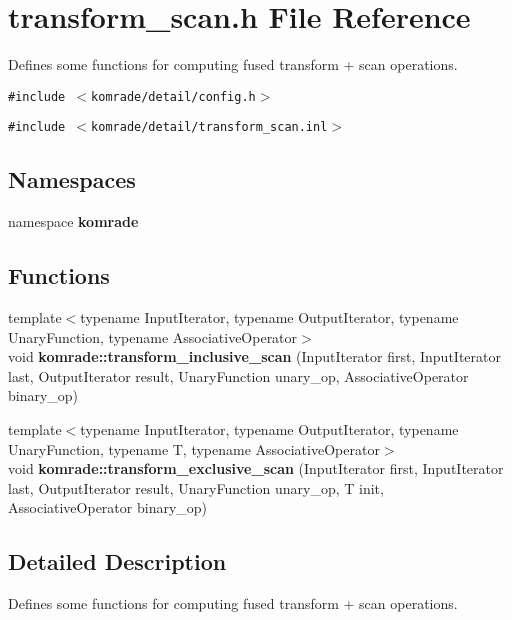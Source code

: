 \section{transform\_\-scan.h File Reference}
\label{transform__scan_8h}
Defines some functions for computing fused transform + scan operations. 

{\tt \#include $<$komrade/detail/config.h$>$}\par
{\tt \#include $<$komrade/detail/transform\_\-scan.inl$>$}\par
\subsection*{Namespaces}
\begin{CompactItemize}
\item 
namespace {\bf komrade}
\end{CompactItemize}
\subsection*{Functions}
\begin{CompactItemize}
\item 
{\footnotesize template$<$typename InputIterator, typename OutputIterator, typename UnaryFunction, typename AssociativeOperator$>$ }\\void {\bf komrade::transform\_\-inclusive\_\-scan} (InputIterator first, InputIterator last, OutputIterator result, UnaryFunction unary\_\-op, AssociativeOperator binary\_\-op)
\item 
{\footnotesize template$<$typename InputIterator, typename OutputIterator, typename UnaryFunction, typename T, typename AssociativeOperator$>$ }\\void {\bf komrade::transform\_\-exclusive\_\-scan} (InputIterator first, InputIterator last, OutputIterator result, UnaryFunction unary\_\-op, T init, AssociativeOperator binary\_\-op)
\end{CompactItemize}


\subsection{Detailed Description}
Defines some functions for computing fused transform + scan operations. 

